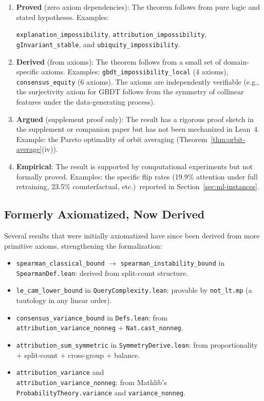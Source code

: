 \documentclass[11pt,a4paper]{article}
\begin{document}
\begin{enumerate}[label=(\alph*)]
  \item \textbf{Proved} (zero axiom dependencies): The theorem
    follows from pure logic and stated hypotheses.  Examples:
    {\raggedright\texttt{explanation\_impossibility},
    \texttt{attribution\_impossibility},
    \texttt{gInvariant\_stable}, and
    \texttt{ubiquity\_impossibility}.\par}

  \item \textbf{Derived} (from axioms): The theorem follows from a small set
    of domain-specific axioms.  Examples: \texttt{gbdt\_impossibility\_local}
    (4 axioms), \texttt{consensus\_equity} (6 axioms).  The axioms are
    independently verifiable (e.g., the surjectivity axiom for GBDT follows
    from the symmetry of collinear features under the data-generating process).

  \item \textbf{Argued} (supplement proof only): The result has a
    rigorous proof sketch in the supplement or companion paper but has
    not been mechanized in Lean~4.  Example: the Pareto optimality of
    orbit averaging (Theorem~\ref{thm:orbit-average}(iv)).

  \item \textbf{Empirical}: The result is supported by computational
    experiments but not formally proved.  Examples: the specific flip
    rates (19.9\% attention under full retraining, 23.5\%
    counterfactual, etc.)\ reported in Section~\ref{sec:ml-instances}.
\end{enumerate}

\subsection{Formerly Axiomatized, Now Derived}

Several results that were initially axiomatized have since been derived from
more primitive axioms, strengthening the formalization:

\begin{itemize}
  \item \texttt{spearman\_classical\_bound} $\to$
    \texttt{spearman\_instability\_bound} in \texttt{SpearmanDef.lean}:
    derived from split-count structure.
  \item \texttt{le\_cam\_lower\_bound} in \texttt{QueryComplexity.lean}:
    provable by \texttt{not\_lt.mp} (a tautology in any linear order).
  \item \texttt{consensus\_variance\_bound} in
    \texttt{Defs.lean}: from\\
    \texttt{attribution\_variance\_nonneg} +
    \texttt{Nat.cast\_nonneg}.
  \item \texttt{attribution\_sum\_symmetric} in
    \texttt{SymmetryDerive.lean}: from proportionality +
    split-count + cross-group + balance.
  \item \texttt{attribution\_variance} and\\
    \texttt{attribution\_variance\_nonneg}: from Mathlib's\\
    \texttt{ProbabilityTheory.variance} and
    \texttt{variance\_nonneg}.
\end{itemize}
\end{document}
